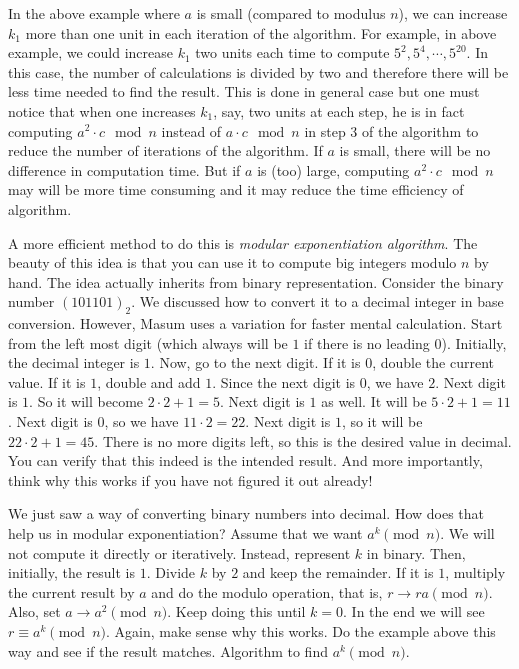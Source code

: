 \documentclass{subfile}
\begin{document}
	\begin{remark}
		In the above example where $a$ is small (compared to modulus $n$), we can increase $k_1$ more than one unit in each iteration of the algorithm. For example, in above example, we could increase $k_1$ two units each time to compute $5^2, 5^4,\cdots, 5^{20}$. In this case, the number of calculations is divided by two and therefore there will be less time needed to find the result. This is done in general case but one must notice that when one increases $k_1$, say, two units at each step, he is in fact computing $a^2 \cdot c \mod n$ instead of $a \cdot c \mod n$ in step $3$ of the algorithm to reduce the number of iterations of the algorithm. If $a$ is small, there will be no difference in computation time. But if $a$ is (too) large, computing $a^2 \cdot c \mod n$ may will be more time consuming and it may reduce the time efficiency of algorithm.
	\end{remark}

	A more efficient method to do this is \textit{modular exponentiation algorithm}. The beauty of this idea is that you can use it to compute big integers modulo $n$ by hand. The idea actually inherits from binary representation. Consider the binary number $(101101)_2$. We discussed how to convert it to a decimal integer in base conversion. However, Masum uses a variation for faster mental calculation. Start from the left most digit (which always will be $1$ if there is no leading $0$). Initially, the decimal integer is $1$. Now, go to the next digit. If it is $0$, double the current value. If it is $1$, double and add $1$. Since the next digit is $0$, we have $2$. Next digit is $1$. So it will become $2\cdot2+1=5$. Next digit is $1$ as well. It will be $5\cdot2+1=11$. Next digit is $0$, so we have $11\cdot2=22$. Next digit is $1$, so it will be $22\cdot2+1=45$. There is no more digits left, so this is the desired value in decimal. You can verify that this indeed is the intended result. And more importantly, think why this works if you have not figured it out already!

	We just saw a way of converting binary numbers into decimal. How does that help us in modular exponentiation? Assume that we want $a^k\pmod n$. We will not compute it directly or iteratively. Instead, represent $k$ in binary. Then, initially, the result is $1$. Divide $k$ by $2$ and keep the remainder. If it is $1$, multiply the current result by $a$ and do the modulo operation, that is, $r\to ra\pmod n$. Also, set $a\to a^2\pmod n$. Keep doing this until $k=0$. In the end we will see $r\equiv a^k\pmod n$. Again, make sense why this works. Do the example above this way and see if the result matches. Algorithm to find $a^k\pmod n$.
\end{document}
